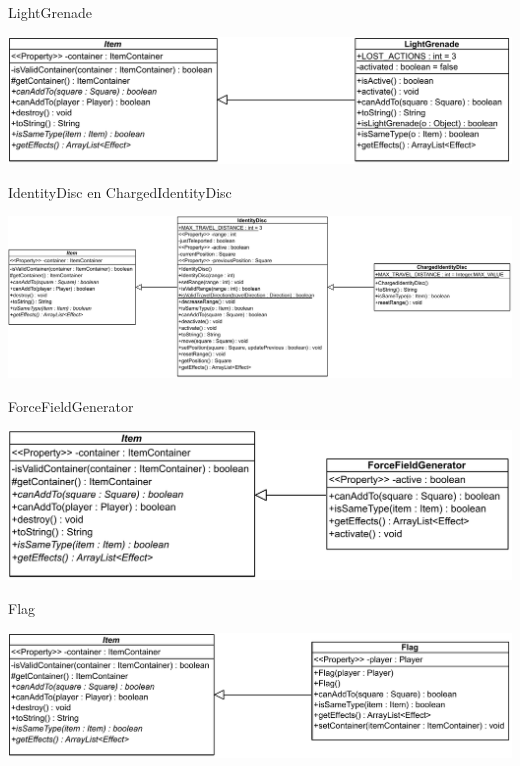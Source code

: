 \documentclass[11pt,t]{beamer}
\begin{document}
\begin{frame}{LightGrenade}
\vspace{0.5in}
\begin{center}
\includegraphics[width=0.9\linewidth]{images/lightgrenade}
\end{center}
\end{frame}

\begin{frame}{IdentityDisc en ChargedIdentityDisc}
\vspace{0.35in}
\begin{center}
\includegraphics[width=0.95\linewidth]{images/identitydisc}
\end{center}
\end{frame}

\begin{frame}{ForceFieldGenerator}
\vspace{0.4in}
\begin{center}
\includegraphics[width=0.95\linewidth]{images/ForceFieldGenerator}
\end{center}
\end{frame}

\begin{frame}{Flag}
\vspace{0.45in}
\begin{center}
\includegraphics[width=0.95\linewidth]{images/Flag}
\end{center}
\end{frame}
\end{document}
